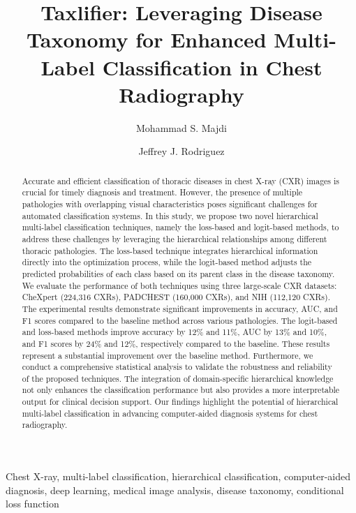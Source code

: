 \documentclass[review,1p,times,numbers]{elsarticle}
\begin{document}
\begin{frontmatter}
    \title{Taxlifier: Leveraging Disease Taxonomy for Enhanced Multi-Label Classification in Chest Radiography}
    \author[]{Mohammad S\@. Majdi}
    \author[]{Jeffrey J\@. Rodriguez}
    \begin{abstract}
Accurate and efficient classification of thoracic diseases in chest X-ray (CXR) images is crucial for timely diagnosis and treatment. However, the presence of multiple pathologies with overlapping visual characteristics poses significant challenges for automated classification systems. In this study, we propose two novel hierarchical multi-label classification techniques, namely the loss-based and logit-based methods, to address these challenges by leveraging the hierarchical relationships among different thoracic pathologies. The loss-based technique integrates hierarchical information directly into the optimization process, while the logit-based method adjusts the predicted probabilities of each class based on its parent class in the disease taxonomy. We evaluate the performance of both techniques using three large-scale CXR datasets: CheXpert (224,316 CXRs), PADCHEST (160,000 CXRs), and NIH (112,120 CXRs). The experimental results demonstrate significant improvements in accuracy, AUC, and F1 scores compared to the baseline method across various pathologies. The logit-based and loss-based methods improve accuracy by 12\% and 11\%, AUC by 13\% and 10\%, and F1 scores by 24\% and 12\%, respectively compared to the baseline. These results represent a substantial improvement over the baseline method. Furthermore, we conduct a comprehensive statistical analysis to validate the robustness and reliability of the proposed techniques. The integration of domain-specific hierarchical knowledge not only enhances the classification performance but also provides a more interpretable output for clinical decision support. Our findings highlight the potential of hierarchical multi-label classification in advancing computer-aided diagnosis systems for chest radiography.
    \end{abstract}
    \begin{keyword}
        Chest X-ray, multi-label classification, hierarchical classification, computer-aided diagnosis, deep learning, medical image analysis, disease taxonomy, conditional loss function
    \end{keyword}
\end{frontmatter}
\end{document}
